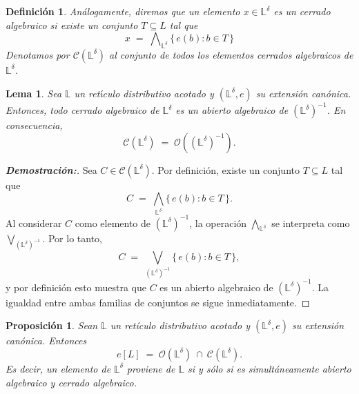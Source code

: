 \documentclass[12pt]{book}
\newtheorem{proposition}[theorem]{Proposición}
\newtheorem{lemma}[theorem]{Lema}
\newtheorem{definition}[theorem]{Definición}
\begin{document}
\begin{definition}\label{def:cerrados} Análogamente, diremos que un elemento $x\in\mathbb{L}^\delta$ es un \emph{cerrado algebraico} si existe un conjunto $T\subseteq L$ tal que
\[x \;=\; \bigwedge\nolimits_{\mathbb{L}^\delta}\{\,e(b):b\in T\,\}\]
Denotamos por $\mathcal{C}(\mathbb{L}^\delta)$ al conjunto de todos los elementos cerrados algebraicos de $\mathbb{L}^\delta$.
\end{definition}

\begin{lemma}\label{lem:cerrados-op}
Sea $\mathbb{L}$ un ret\'{\i}culo distributivo acotado y $(\mathbb{L}^\delta,e)$ su extensi\'on can\'onica. 
Entonces, todo cerrado algebraico de $\mathbb{L}^\delta$ es un abierto algebraico de $(\mathbb{L}^\delta)^{-1}$. En consecuencia,
\[
\mathcal{C}(\mathbb{L}^\delta)
\;=\;
\mathcal{O}\!\left((\mathbb{L}^\delta)^{-1}\right).
\]
\end{lemma}
\begin{proof}[\textbf{Demostración:}]
Sea $C\in\mathcal{C}(\mathbb{L}^\delta)$. Por definici\'on, existe un conjunto $T\subseteq L$ tal que
\[
C \;=\; \bigwedge_{\mathbb{L}^\delta}\{\,e(b):b\in T\,\}.
\]
Al considerar $C$ como elemento de $(\mathbb{L}^\delta)^{-1}$, la operaci\'on $\bigwedge_{\mathbb{L}^\delta}$ se interpreta como 
$\bigvee_{(\mathbb{L}^\delta)^{-1}}$. Por lo tanto,
\[
C
\;=\;
\bigvee_{(\mathbb{L}^\delta)^{-1}}\{\,e(b):b\in T\,\},
\]
y por definici\'on esto muestra que $C$ es un abierto algebraico de $(\mathbb{L}^\delta)^{-1}$. 
La igualdad entre ambas familias de conjuntos se sigue inmediatamente.
\end{proof}


\begin{proposition}\label{prop:clopen-is-image}
Sean $\mathbb{L}$ un retículo distributivo acotado y $(\mathbb{L}^\delta,e)$ su extensión canónica.
Entonces
\[
e[L] \;=\; \mathcal{O}(\mathbb{L}^\delta)\ \cap\ \mathcal{C}(\mathbb{L}^\delta).
\]
Es decir, un elemento de $\mathbb{L}^\delta$ proviene de $\mathbb{L}$ si y sólo si es simultáneamente abierto algebraico y cerrado algebraico.
\end{proposition}
\end{document}
